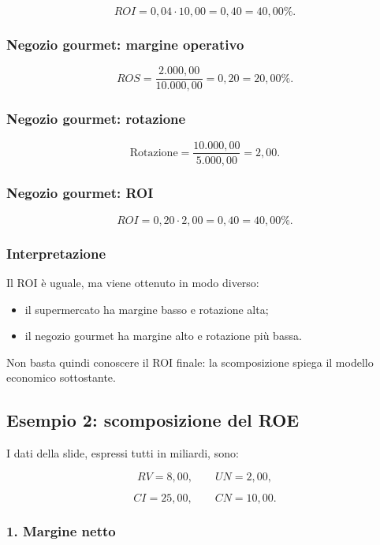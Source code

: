 \[
ROI=0{,}04\cdot10{,}00
=
0{,}40
=
\boxed{40{,}00\%}.
\]


\subsubsection*{Negozio gourmet: margine operativo}

\[
ROS=
\frac{2.000{,}00}{10.000{,}00}
=
0{,}20
=
\boxed{20{,}00\%}.
\]


\subsubsection*{Negozio gourmet: rotazione}

\[
\text{Rotazione}
=
\frac{10.000{,}00}{5.000{,}00}
=
\boxed{2{,}00}.
\]


\subsubsection*{Negozio gourmet: ROI}

\[
ROI=0{,}20\cdot2{,}00
=
0{,}40
=
\boxed{40{,}00\%}.
\]


\subsubsection*{Interpretazione}

\noindent Il ROI è uguale,
ma viene ottenuto in modo diverso:

\begin{itemize}
    \item il supermercato
    ha margine basso e rotazione alta;

    \item il negozio gourmet
    ha margine alto e rotazione più bassa.
\end{itemize}

\noindent Non basta quindi
conoscere il ROI finale:
la scomposizione spiega
il modello economico sottostante.


\subsection*{Esempio 2:
scomposizione del ROE}

\noindent I dati della slide,
espressi tutti in miliardi,
sono:

\[
RV=8{,}00,
\qquad
UN=2{,}00,
\]

\[
CI=25{,}00,
\qquad
CN=10{,}00.
\]


\subsubsection*{1. Margine netto}


